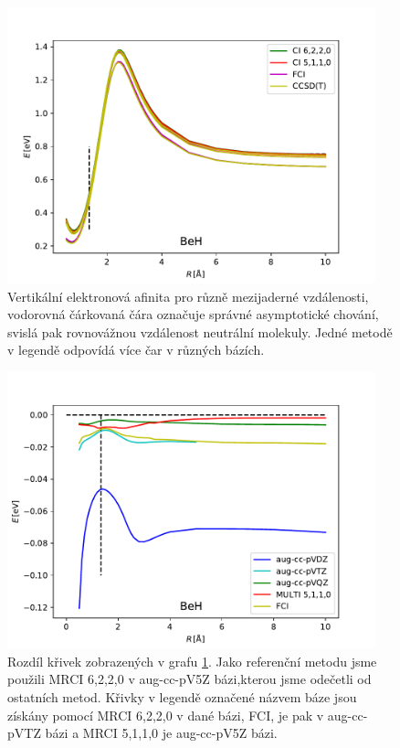 \begin{figure}
\centering
\includegraphics[width=0.95\textwidth]{../img/BeH-lin.pdf}
\caption{Vertikální elektronová afinita pro různě mezijaderné vzdálenosti, vodorovná čárkovaná čára označuje správné asymptotické chování, svislá pak rovnovážnou vzdálenost neutrální molekuly. Jedné metodě v legendě odpovídá více čar v různých bázích.}
\label{grBeHlin}
\end{figure}

\begin{figure}
\centering
\includegraphics[width=0.95\textwidth]{../img/BeH-lin-dif.pdf}
\caption{Rozdíl křivek zobrazených v grafu \ref{grBeHlin}. Jako referenční metodu jsme použili MRCI 6,2,2,0 v aug-cc-pV5Z bázi,kterou jsme odečetli od ostatních metod.
Křivky v legendě označené názvem báze jsou získány pomocí MRCI 6,2,2,0 v dané bázi, FCI, je pak v aug-cc-pVTZ bázi a MRCI 5,1,1,0 je aug-cc-pV5Z bázi.}
\label{grBeHlindif}
\end{figure}


